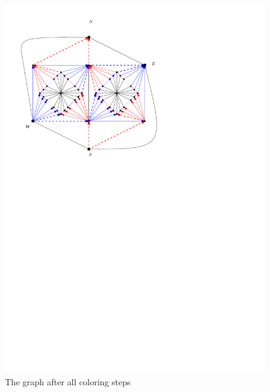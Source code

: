   \begin{figure}[h]
    \centering
    \includegraphics[scale=1]{fixExtension/img/manymany4}
    \caption{The graph after all coloring steps}
    \label{fig:fix:manymany4}
  \end{figure}
